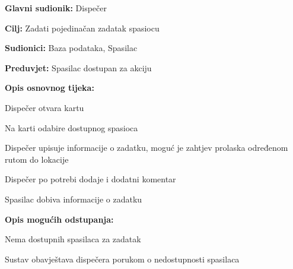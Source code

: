 					\noindent {}
					\begin{packed_item}
	
						\item \textbf{Glavni sudionik: }\text Dispečer
						\item  \textbf{Cilj:} \text Zadati pojedinačan zadatak spasiocu
						\item  \textbf{Sudionici:} \text Baza podataka, Spasilac
						\item  \textbf{Preduvjet:} \text Spasilac dostupan za akciju
						\item  \textbf{Opis osnovnog tijeka:}
						
						\item[] \begin{packed_enum}
	
							\item \text Dispečer otvara kartu
							\item \text Na karti odabire dostupnog spasioca
							\item \text Dispečer upisuje informacije o zadatku, moguć je zahtjev prolaska određenom rutom do lokacije
							\item \text Dispečer po potrebi dodaje i dodatni komentar
							\item \text Spasilac dobiva informacije o zadatku
						\end{packed_enum}
						
						\item  \textbf{Opis mogućih odstupanja:}
						
						\item[] \begin{packed_item}
	
							\item[2.a] \text Nema dostupnih spasilaca za zadatak
							\item[] \begin{packed_item}
								
								\item \text Sustav obavještava dispečera porukom o nedostupnosti spasilaca
								
							\end{packed_item}
							
						\end{packed_item}
					\end{packed_item}		

